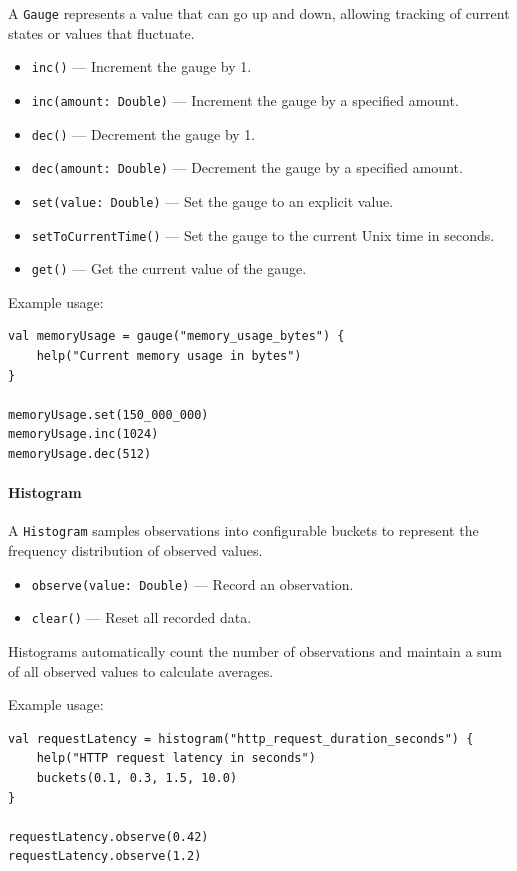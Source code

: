 A \texttt{Gauge} represents a value that can go up and down, allowing tracking of current states or values that fluctuate.

\begin{itemize}
    \item \texttt{inc()} — Increment the gauge by 1.
    \item \texttt{inc(amount: Double)} — Increment the gauge by a specified amount.
    \item \texttt{dec()} — Decrement the gauge by 1.
    \item \texttt{dec(amount: Double)} — Decrement the gauge by a specified amount.
    \item \texttt{set(value: Double)} — Set the gauge to an explicit value.
    \item \texttt{setToCurrentTime()} — Set the gauge to the current Unix time in seconds.
    \item \texttt{get()} — Get the current value of the gauge.
\end{itemize}

Example usage:

\begin{lstlisting}
val memoryUsage = gauge("memory_usage_bytes") {
    help("Current memory usage in bytes")
}

memoryUsage.set(150_000_000)
memoryUsage.inc(1024)
memoryUsage.dec(512)
\end{lstlisting}

\paragraph{Histogram}

A \texttt{Histogram} samples observations into configurable buckets to represent the frequency distribution of observed values.

\begin{itemize}
    \item \texttt{observe(value: Double)} — Record an observation.
    \item \texttt{clear()} — Reset all recorded data.
\end{itemize}

Histograms automatically count the number of observations and maintain a sum of all observed values to calculate averages.

Example usage:

\begin{lstlisting}
val requestLatency = histogram("http_request_duration_seconds") {
    help("HTTP request latency in seconds")
    buckets(0.1, 0.3, 1.5, 10.0)
}

requestLatency.observe(0.42)
requestLatency.observe(1.2)
\end{lstlisting}

